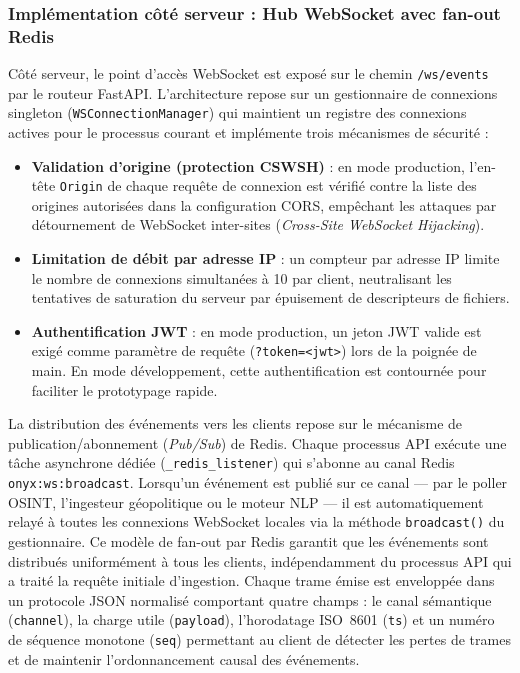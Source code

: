 \subsubsection{Implémentation côté serveur : Hub WebSocket avec fan-out Redis}

Côté serveur, le point d'accès WebSocket est exposé sur le chemin \texttt{/ws/events} par le routeur FastAPI. L'architecture repose sur un gestionnaire de connexions singleton (\texttt{WSConnectionManager}) qui maintient un registre des connexions actives pour le processus courant et implémente trois mécanismes de sécurité :

\begin{itemize}
    \item \textbf{Validation d'origine (protection CSWSH)} : en mode production, l'en-tête \texttt{Origin} de chaque requête de connexion est vérifié contre la liste des origines autorisées dans la configuration CORS, empêchant les attaques par détournement de WebSocket inter-sites (\textit{Cross-Site WebSocket Hijacking}).
    \item \textbf{Limitation de débit par adresse IP} : un compteur par adresse IP limite le nombre de connexions simultanées à 10 par client, neutralisant les tentatives de saturation du serveur par épuisement de descripteurs de fichiers.
    \item \textbf{Authentification JWT} : en mode production, un jeton JWT valide est exigé comme paramètre de requête (\texttt{?token=<jwt>}) lors de la poignée de main. En mode développement, cette authentification est contournée pour faciliter le prototypage rapide.
\end{itemize}

La distribution des événements vers les clients repose sur le mécanisme de publication/abonnement (\textit{Pub/Sub}) de Redis. Chaque processus API exécute une tâche asynchrone dédiée (\texttt{\_redis\_listener}) qui s'abonne au canal Redis \texttt{onyx:ws:broadcast}. Lorsqu'un événement est publié sur ce canal --- par le poller OSINT, l'ingesteur géopolitique ou le moteur NLP --- il est automatiquement relayé à toutes les connexions WebSocket locales via la méthode \texttt{broadcast()} du gestionnaire. Ce modèle de fan-out par Redis garantit que les événements sont distribués uniformément à tous les clients, indépendamment du processus API qui a traité la requête initiale d'ingestion. Chaque trame émise est enveloppée dans un protocole JSON normalisé comportant quatre champs : le canal sémantique (\texttt{channel}), la charge utile (\texttt{payload}), l'horodatage ISO~8601 (\texttt{ts}) et un numéro de séquence monotone (\texttt{seq}) permettant au client de détecter les pertes de trames et de maintenir l'ordonnancement causal des événements.

